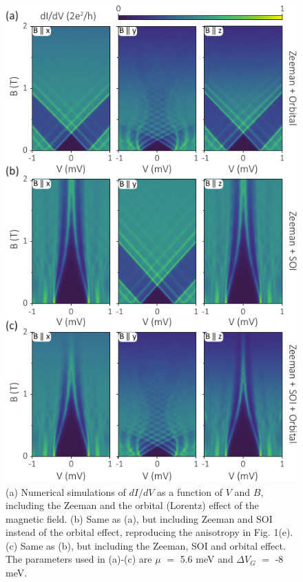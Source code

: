 \begin{figure}
\includegraphics[width=\columnwidth]{chapter_spinorbit/figures/Fig2.pdf}
\caption{\label{fig:fig2}
(a) Numerical simulations of $dI/dV$ as a function of $V$ and $B$, including the Zeeman and the orbital (Lorentz) effect of the magnetic field.
(b) Same as (a), but including Zeeman and SOI instead of the orbital effect, reproducing the anisotropy in Fig. 1(e).
(c) Same as (b), but including the Zeeman, SOI and orbital effect.
The parameters used in (a)-(c) are $\mu$ $=$ 5.6 meV and $\Delta V_G$ $=$ -8 meV.
}
\end{figure}

